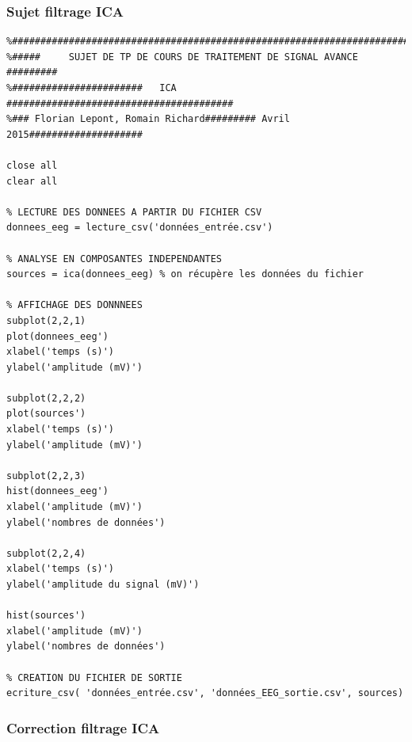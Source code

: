 \subsubsection{Sujet filtrage ICA}

\begin{verbatim}
%##########################################################################
%#####     SUJET DE TP DE COURS DE TRAITEMENT DE SIGNAL AVANCE    #########
%#######################   ICA     ########################################
%### Florian Lepont, Romain Richard######### Avril 2015####################

close all
clear all

% LECTURE DES DONNEES A PARTIR DU FICHIER CSV
donnees_eeg = lecture_csv('données_entrée.csv')

% ANALYSE EN COMPOSANTES INDEPENDANTES
sources = ica(donnees_eeg) % on récupère les données du fichier

% AFFICHAGE DES DONNNEES
subplot(2,2,1) 
plot(donnees_eeg')
xlabel('temps (s)')
ylabel('amplitude (mV)')

subplot(2,2,2)
plot(sources')
xlabel('temps (s)')
ylabel('amplitude (mV)')

subplot(2,2,3)
hist(donnees_eeg')
xlabel('amplitude (mV)')
ylabel('nombres de données')

subplot(2,2,4)
xlabel('temps (s)')
ylabel('amplitude du signal (mV)')

hist(sources')
xlabel('amplitude (mV)')
ylabel('nombres de données')

% CREATION DU FICHIER DE SORTIE
ecriture_csv( 'données_entrée.csv', 'données_EEG_sortie.csv', sources)
\end{verbatim}



\newpage
\subsubsection{Correction filtrage ICA}

